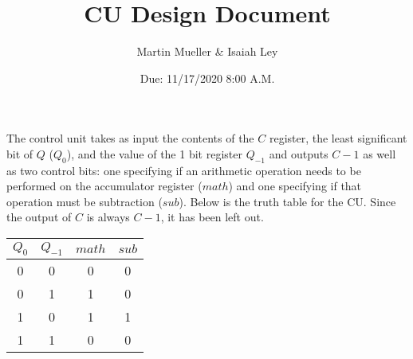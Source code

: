\documentclass[11pt]{article}
\title{CU Design Document}
\author{Martin Mueller \& Isaiah Ley}
\date{Due: 11/17/2020 8:00 A.M.}
\begin{document}
	\maketitle

	The control unit takes as input the contents of the $C$ register, the least significant bit of $Q$ ($Q_0$), and the value of the 1 bit register $Q_{-1}$ and outputs $C - 1$ as well as two control bits: one specifying if an arithmetic operation needs to be performed on the accumulator register ($math$) and one specifying if that operation must be subtraction ($sub$).
	Below is the truth table for the CU.
	Since the output of $C$ is always $C - 1$, it has been left out.

	\begin{center}
		\begin{tabular}{c|c||c|c}
			$Q_{0}$ & $Q_{-1}$ & $math$ & $sub$ \\
			\hline
			0 & 0 & 0 & 0 \\
			0 & 1 & 1 & 0 \\
			1 & 0 & 1 & 1 \\
			1 & 1 & 0 & 0
		\end{tabular}
	\end{center}
\end{document}
